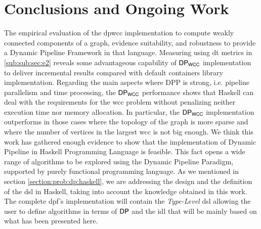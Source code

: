 \section{Conclusions and Ongoing Work}\label{conc}
The empirical evaluation of the \acrshort{dpwcc} implementation to compute weakly connected components of a graph, evidence suitability, and robustness to provide a Dynamic Pipeline Framework in that language. Measuring  using \acrshort{dt} metrics in \autoref{sub:sub:sec:e2} reveals some advantageous capability of $\mathsf{DP_{WCC}}$ implementation to deliver incremental results compared with default containers library implementation. Regarding the main aspects where DPP is strong, i.e. pipeline parallelism and time processing, the $\mathsf{DP_{WCC}}$ performance shows that Haskell can deal with the requirements for the \acrshort{wcc} problem without penalizing neither execution time nor memory allocation. In particular, the $\mathsf{DP_{WCC}}$ implementation outperforms in those cases where the topology of the graph is more sparse and where the number of vertices in the largest \acrshort{wcc} is not big enough. We think this work has gathered enough evidence to show that the implementation of Dynamic Pipeline in Haskell Programming Language is feasible. This fact opens a wide range of algorithms to be explored using the Dynamic Pipeline Paradigm, supported by purely functional programming language. As we mentioned in section \autoref{section:prob:dp:haskell}, we are addressing the design and the definition of the \acrshort{dsl} in Haskell, taking into account the knowledge obtained in this work. The complete \acrshort{dpf}'s implementation will contain the \textit{Type-Level} \acrshort{dsl} allowing the user to define algorithms in terms of $\mathsf{DP}$ and the \acrfull{idl} that will be mainly based on what has been presented here.

